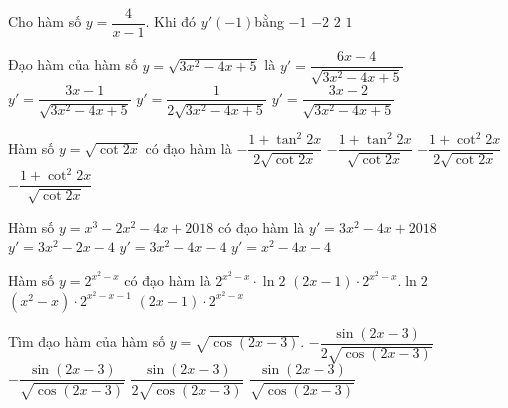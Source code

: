\begin{ex}%
	Cho hàm số $ y=\dfrac{4}{x-1}$. Khi  đó $y'\left(-1\right)$bằng
	 \choice
		{\True $-1$} 
		 {$-2$}
		 {$2$}
		 {$1$}
\end{ex}

\begin{ex}%
	 Đạo hàm của hàm số $y=\sqrt{3x^2-4x+5}$ là
	\choice 
		{$y'=\dfrac{6x-4}{\sqrt{3x^2-4x+5}}$} 
		 {$y'=\dfrac{3x-1}{\sqrt{3x^2-4x+5}}$}
		 {$y'=\dfrac{1}{2\sqrt{3x^2-4x+5}}$}
		{\True $y'=\dfrac{3x-2}{\sqrt{3x^2-4x+5}}$} 
\end{ex}

\begin{ex}%
	Hàm số $y=\sqrt{\cot 2x}$ có đạo  hàm là
	 \choice
		{$-\dfrac{1+\tan^2 2x}{2\sqrt{\cot 2x}}$} 
		{$-\dfrac{1+\tan^2 2x}{\sqrt{\cot  2x}}$}
		{$-\dfrac{1+\cot^2 2x}{2\sqrt{\cot 2x}}$} 
		 {\True$-\dfrac{1+\cot^2 2x}{\sqrt{\cot 2x}}$}
\end{ex}

\begin{ex}%
	Hàm  số $y=x^3-2x^2-4x + 2018$ có đạo hàm là
	 \choice
		 {$y'=3x^2-4x+2018$}
		 {$y'=3x^2-2x-4$}
		 {\True$y'=3x^2-4x-4$}
		{$y'=x^2-4x-4$} 
\end{ex}

\begin{ex}%
	Hàm số $y=2^{x^2-x}$ có đạo hàm là 
	 \choice
		{$2^{x^2-x}\cdot\ln 2$} 
		 {\True$(2x-1)\cdot2^{x^2-x}.\ln 2$}
		 {$(x^2-x)\cdot2^{x^2-x-1}$}
		 {$(2x-1)\cdot2^{x^2-x}$}
\end{ex}

\begin{ex}%
	Tìm  đạo hàm của hàm số $y = \sqrt{\cos(2x - 3)}$.
	 \choice
		{$-\dfrac{\sin  (2x - 3)}{2\sqrt{\cos( 2x - 3)}}$}
		{\True $-\dfrac{\sin (2x - 3)}{\sqrt{\cos( 2x - 3)}}$} 
		{$\dfrac{\sin  (2x - 3)}{2\sqrt{\cos( 2x - 3)}}$}
		{$\dfrac{\sin (2x - 3)}{\sqrt{\cos( 2x  - 3)}}$}
\end{ex}

